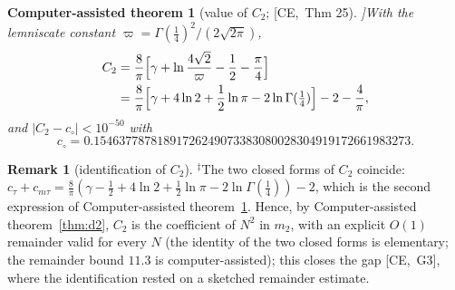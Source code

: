 \documentclass[10pt,a4paper]{article}
\theoremstyle{plain}
\newtheorem{catheorem}[theorem]{Computer-assisted theorem}
\theoremstyle{definition}
\newtheorem{remark}[theorem]{Remark}
\newcommand{\SYN}{\ensuremath{^{\ddagger}}}      %
\newcommand{\src}[2]{[\textsf{#1},~#2]}           %
\newcommand{\CER}{\textsf{CE}}
\begin{document}
\begin{catheorem}[value of $C_2$; \src{\CER}{Thm 25}]\label{thm:C2}
With the lemniscate constant $\varpi=\Gamma(\frac14)^2/(2\sqrt{2\pi})$,
\begin{align*}C_2&=\frac8\pi\Bigl[\gamma+\ln\frac{4\sqrt2}\varpi-\frac12-\frac\pi4\Bigr]\\&=\frac8\pi\Bigl[\gamma+4\ln2+\frac12\ln\pi-2\ln\Gamma(\tfrac14)\Bigr]-2-\frac4\pi,\end{align*}
and $|C_2-c_\circ|<10^{-50}$ with
\[c_\circ=0.15463778781891726249073383080028304919172661983273 .\]
\end{catheorem}
\begin{remark}[identification of $C_2$]\SYN\label{rem:C2id}
The two closed forms of $C_2$ coincide: $c_\tau+c_{m\tau}=\frac8\pi(\gamma-\frac12+4\ln2+\frac12\ln\pi-2\ln\Gamma(\frac14))-2$, which is the second expression of Computer-assisted theorem~\ref{thm:C2}. Hence, by Computer-assisted theorem~\ref{thm:d2}, $C_2$ is the coefficient of $N^2$ in $m_2$, with an explicit $O(1)$ remainder valid for every $N$ (the identity of the two closed forms is elementary; the remainder bound $11.3$ is computer-assisted); this closes the gap \src{\CER}{G3}, where the identification rested on a sketched remainder estimate.
\end{remark}
\end{document}
